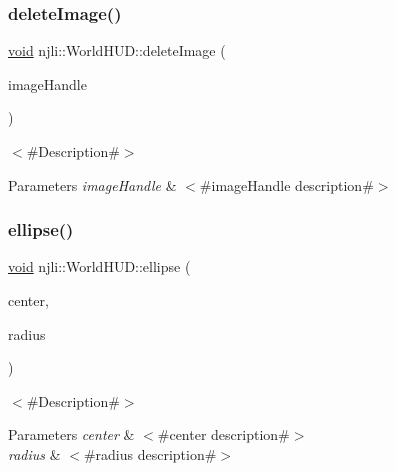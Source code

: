 \subsubsection{\texorpdfstring{delete\+Image()}{deleteImage()}}
{\footnotesize\ttfamily \mbox{\hyperlink{_thread_8h_af1e856da2e658414cb2456cb6f7ebc66}{void}} njli\+::\+World\+H\+U\+D\+::delete\+Image (\begin{DoxyParamCaption}\item[{\mbox{\hyperlink{_util_8h_aa62c75d314a0d1f37f79c4b73b2292e2}{s32}}}]{image\+Handle }\end{DoxyParamCaption})}

$<$\#\+Description\#$>$


\begin{DoxyParams}{Parameters}
{\em image\+Handle} & $<$\#image\+Handle description\#$>$ \\
\hline
\end{DoxyParams}
\mbox{\label{classnjli_1_1_world_h_u_d_af1b141d1009fc9a9c8de94c4709edf65}} 
\subsubsection{\texorpdfstring{ellipse()}{ellipse()}\hspace{0.1cm}{\footnotesize\ttfamily [1/2]}}
{\footnotesize\ttfamily \mbox{\hyperlink{_thread_8h_af1e856da2e658414cb2456cb6f7ebc66}{void}} njli\+::\+World\+H\+U\+D\+::ellipse (\begin{DoxyParamCaption}\item[{const bt\+Vector2 \&}]{center,  }\item[{const bt\+Vector2 \&}]{radius }\end{DoxyParamCaption})}

$<$\#\+Description\#$>$


\begin{DoxyParams}{Parameters}
{\em center} & $<$\#center description\#$>$ \\
\hline
{\em radius} & $<$\#radius description\#$>$ \\
\hline
\end{DoxyParams}
\mbox{\label{classnjli_1_1_world_h_u_d_ab9865a7ca65ce8e64f79983e6558fac3}} 
